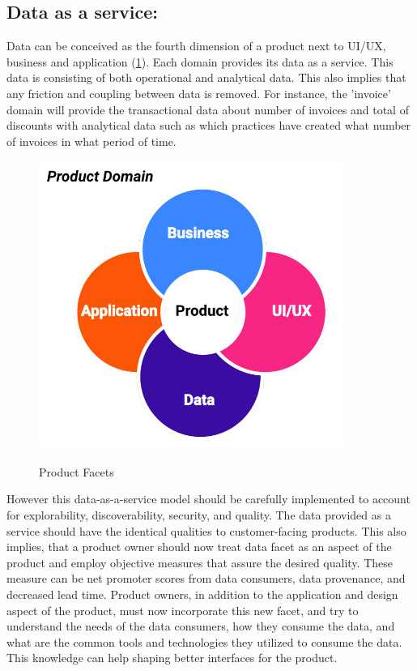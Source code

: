\documentclass[review]{elsarticle}
\begin{document}
\subsection{Data as a service:}

Data can be conceived as the fourth dimension of a product next to UI/UX, business and application (\ref{data-facets}). Each domain provides its data as a service. This data is consisting of both operational and analytical data. This also implies that any friction and coupling between data is removed. For instance, the 'invoice' domain will provide the transactional data about number of invoices and total of discounts with analytical data such as which practices have created what number of invoices in what period of time.

\begin{figure}[h!]
    \centering
    \includegraphics[width=10cm]{Media/product-facets.jpg}
    \label{data-facets}
    \caption{Product Facets}
\end{figure}

However this data-as-a-service model should be carefully implemented to account for explorability, discoverability, security, and quality. The data provided as a service should have the identical qualities to customer-facing products. This also implies, that a product owner should now treat data facet as an aspect of the product and employ objective measures that assure the desired quality. These measure can be net promoter scores from data consumers, data provenance, and decreased lead time. Product owners, in addition to the application and design aspect of the product, must now incorporate this new facet, and try to understand the needs of the data consumers, how they consume the data, and what are the common tools and technologies they utilized to consume the data. This knowledge can help shaping better interfaces for the product.
\end{document}

